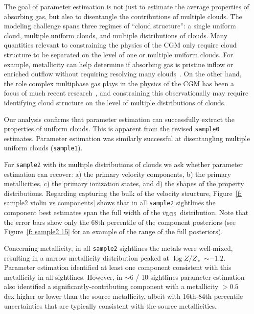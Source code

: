 \documentclass[fleqn,usenatbib]{mnras}
\newcommand{\metallicity}{$\log Z/Z_{\sun}$}
\begin{document}
The goal of parameter estimation is not just to estimate the average properties of absorbing gas,
but also to disentangle the contributions of multiple clouds.
The modeling challenge spans three regimes of ``cloud structure'':
a single uniform cloud,
multiple uniform clouds,
and multiple distributions of clouds.
Many quantities relevant to constraining the physics of the CGM only require cloud structure to be separated on the level of one or multiple uniform clouds.
For example, metallicity can help determine if absorbing gas is pristine inflow or enriched outflow without requiring resolving many clouds~\citep[e.g.][]{hafen2017Lowredshift}.
On the other hand, the role complex multiphase gas plays in the physics of the CGM has been a focus of much recent research~\citep[e.g.][]{voit2015Precipitationregulated, esmerian2021Thermal, smith2023Arkenstone, tan2023Cloudy},
and constraining this observationally may require identifying cloud structure on the level of multiple distributions of clouds.

Our analysis confirms that parameter estimation can successfully extract the properties of uniform clouds.
This is apparent from the revised \texttt{sample0} estimates.
Parameter estimation was similarly successful at disentangling multiple uniform clouds (\texttt{sample1}).

For \texttt{sample2} with its multiple distributions of clouds we ask whether parameter estimation can recover:
a) the primary velocity components,
b) the primary metallicities,
c) the primary ionization states, and
d) the shapes of the property distributions.
Regarding capturing the bulk of the velocity structure, Figure~\ref{f: sample2 violin vs components} shows that in all \texttt{sample2} sightlines the component best estimates span the full width of the $v_{\rm LOS}$ distribution.
Note that the error bars show only the 68th percentile of the component posteriors (see Figure~\ref{f: sample2 15} for an example of the range of the full posteriors).

Concerning metallicity, in all \texttt{sample2} sightlines the metals were well-mixed, resulting in a narrow metallicity distribution peaked at {\metallicity} $\sim -1.2$.
Parameter estimation identified at least one component consistent with this metallicity in all sightlines.
However, in $\sim 6$ / 10 sightlines parameter estimation also identified a significantly-contributing component with a metallicity $>0.5$ dex higher or lower than the source metallicity,
albeit with 16th-84th percentile uncertainties that are typically consistent with the source metallicities.
\end{document}
